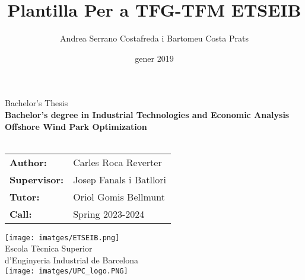 \documentclass[a4paper,11pt, titlepage, twoside]{article}
\title{Plantilla Per a TFG-TFM ETSEIB}
\author{Andrea Serrano Costafreda i Bartomeu Costa Prats }
\date{gener 2019}
\begin{document}
\renewcommand{\refname}{Bibliography}
\begin{titlepage}
    {\centering
    {\Huge Bachelor's Thesis}\\
    \vspace{5mm}
    {\Large \textbf{Bachelor's degree in Industrial Technologies and Economic Analysis}}\\
    \vspace{20mm}
    \Huge \textbf{Offshore Wind Park Optimization}\\
    \vspace{10mm}
    \vspace{3mm}
    \Large{}\\  %
    }
    \vspace{20mm}
    \hspace{2mm}
    \begin{tabular}{l@{ } l}
        \vspace{5mm}
        \Large \textbf{Author:} & \Large{Carles Roca Reverter} \\
        \vspace{5mm}
        \Large\textbf{Supervisor:} & \Large{Josep Fanals i Batllori}\\
        \vspace{5mm}
        \Large\textbf{Tutor:} & \Large{Oriol Gomis Bellmunt}\\
        
         \Large\textbf{Call: } & \Large{Spring 2023-2024}\\
    \end{tabular}\par
    \vspace{10mm}
    {\centering
    \texttt{[image: imatges/ETSEIB.png]}\\
    {\Large Escola Tècnica Superior \\ d'Enginyeria Industrial de Barcelona}\\
    \vspace{3mm}
    \texttt{[image: imatges/UPC\_logo.PNG]}
    \par
    }
    \end{titlepage}

\clearpage
\thispagestyle{empty}
\null\newpage 
{}
\end{document}
